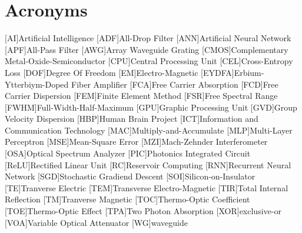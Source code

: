 \chapter*{Acronyms}
\markboth{}{}
\begin{multicols}{2}
\begin{acronym}[EYDFA]
	
	[AI]{Artificial Intelligence}
	[ADF]{All-Drop Filter}
	[ANN]{Artificial Neural Network}
	[APF]{All-Pass Filter}
	[AWG]{Array Waveguide Grating}
	[CMOS]{Complementary Metal-Oxide-Semiconductor}
	[CPU]{Central Processing Unit}
	[CEL]{Cross-Entropy Loss}
	[DOF]{Degree Of Freedom}
	[EM]{Electro-Magnetic}
	[EYDFA]{Erbium-Ytterbiym-Doped Fiber Amplifier}
	[FCA]{Free Carrier Absorption}
	[FCD]{Free Carrier Dispersion}
	[FEM]{Finite Element Method}
	[FSR]{Free Spectral Range}
	[FWHM]{Full-Width-Half-Maximum}
	[GPU]{Graphic Processing Unit}
	[GVD]{Group Velocity Dispersion}
	[HBP]{Human Brain Project}
	[ICT]{Information and Communication Technology}
	[MAC]{Multiply-and-Accumulate}
	[MLP]{Multi-Layer Perceptron}
	[MSE]{Mean-Square Error}
	[MZI]{Mach-Zehnder Interferometer}
	[OSA]{Optical Spectrum Analyzer}
	[PIC]{Photonics Integrated Circuit}
	[ReLU]{Rectified Linear Unit}
	[RC]{Reservoir Computing}
	[RNN]{Recurrent Neural Network}
	[SGD]{Stochastic Gradiend Descent}
	[SOI]{Silicon-on-Insulator}
	[TE]{Tranverse Electric}
	[TEM]{Transverse Electro-Magnetic}
	[TIR]{Total Internal Reflection}
	[TM]{Tranverse Magnetic}
	[TOC]{Thermo-Optic Coefficient}
	[TOE]{Thermo-Optic Effect}
	[TPA]{Two Photon Absorption}
	[XOR]{exclusive-or}
	[VOA]{Variable Optical Attenuator}
	[WG]{waveguide}
\end{acronym}
\end{multicols}
